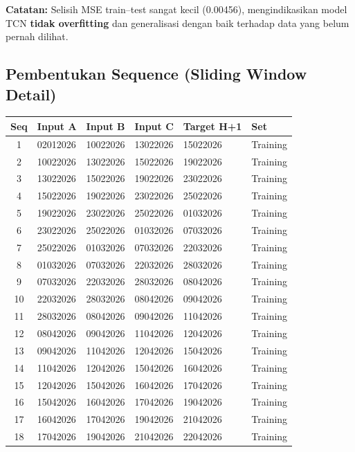 \documentclass[11pt,a4paper]{article}
\begin{document}
\noindent\textbf{Catatan:} Selisih MSE train--test sangat kecil (0.00456), mengindikasikan model TCN \textbf{tidak overfitting} dan generalisasi dengan baik terhadap data yang belum pernah dilihat.

\subsection{Pembentukan Sequence (Sliding Window Detail)}
\begin{longtable}{clllll}
    \toprule
    \textbf{Seq} & \textbf{Input A} & \textbf{Input B} & \textbf{Input C} & \textbf{Target H+1} & \textbf{Set} \\
    \midrule
    \endhead
    1  & 02012026 & 10022026 & 13022026 & 15022026 & Training \\
    2  & 10022026 & 13022026 & 15022026 & 19022026 & Training \\
    3  & 13022026 & 15022026 & 19022026 & 23022026 & Training \\
    4  & 15022026 & 19022026 & 23022026 & 25022026 & Training \\
    5  & 19022026 & 23022026 & 25022026 & 01032026 & Training \\
    6  & 23022026 & 25022026 & 01032026 & 07032026 & Training \\
    7  & 25022026 & 01032026 & 07032026 & 22032026 & Training \\
    8  & 01032026 & 07032026 & 22032026 & 28032026 & Training \\
    9  & 07032026 & 22032026 & 28032026 & 08042026 & Training \\
    10 & 22032026 & 28032026 & 08042026 & 09042026 & Training \\
    11 & 28032026 & 08042026 & 09042026 & 11042026 & Training \\
    12 & 08042026 & 09042026 & 11042026 & 12042026 & Training \\
    13 & 09042026 & 11042026 & 12042026 & 15042026 & Training \\
    14 & 11042026 & 12042026 & 15042026 & 16042026 & Training \\
    15 & 12042026 & 15042026 & 16042026 & 17042026 & Training \\
    16 & 15042026 & 16042026 & 17042026 & 19042026 & Training \\
    17 & 16042026 & 17042026 & 19042026 & 21042026 & Training \\
    18 & 17042026 & 19042026 & 21042026 & 22042026 & Training \\

\end{longtable}
\end{document}
